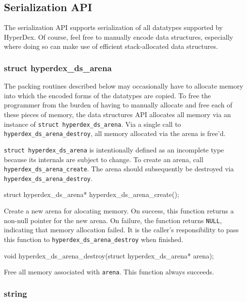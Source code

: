 \subsection{Serialization API}

The serialization API supports serialization of all datatypes supported by
HyperDex.  Of course, feel free to manually encode data structures, especially
where doing so can make use of efficient stack-allocated data structures.

\subsubsection{struct hyperdex\_ds\_arena}

The packing routines described below may occasionally have to allocate memory
into which the encoded forms of the datatypes are copied.  To free the
programmer from the burden of having to manually allocate and free each of these
pieces of memory, the data structures API allocates all memory via an instance
of \texttt{struct hyperdex\_ds\_arena}.  Via a single call to
\texttt{hyperdex\_ds\_arena\_destroy}, all memory allocated via the arena is
free'd.

\texttt{struct hyperdex\_ds\_arena} is intentionally defined as an incomplete
type because its internals are subject to change.  To create an arena, call
\texttt{hyperdex\_ds\_arena\_create}.  The arena should subsequently be
destroyed via \texttt{hyperdex\_ds\_arena\_destroy}.

\begin{ccode}
struct hyperdex_ds_arena* hyperdex_ds_arena_create();
\end{ccode}
\funcdesc Create a new arena for alocating memory.  On success, this function
returns a non-null pointer for the new arena.  On failure, the function returns
\texttt{NULL}, indicating that memory allocation failed.  It is the caller's
responsibility to pass this function to \texttt{hyperdex\_ds\_arena\_destroy}
when finished.

\funcsep
\begin{ccode}
void hyperdex_ds_arena_destroy(struct hyperdex_ds_arena* arena);
\end{ccode}
\funcdesc Free all memory associated with \texttt{arena}.  This function always
succeeds.

\subsubsection{string}

